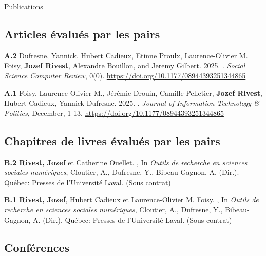 \documentclass{resume} %
\begin{document}
\begin{rSection}{Publications}

\subsection*{Articles évalués par les pairs}

{\textbf{A.2} Dufresne, Yannick, Hubert Cadieux, Etinne Proulx, Laurence-Olivier M. Foisy, \textbf{Jozef Rivest}, Alexandre Bouillon, and Jeremy Gilbert. 2025. . \textit{Social Science Computer Review}, 0(0). \href{https://doi.org/10.1177/08944393251344865}{https://doi.org/10.1177/08944393251344865}}

{\textbf{A.1} Foisy, Laurence-Olivier M., Jérémie Drouin, Camille Pelletier, \textbf{Jozef Rivest}, Hubert Cadieux, Yannick Dufresne. 2025. . \textit{Journal of Information Technology \& Politics}, December, 1-13. \href{https://doi.org/10.1177/08944393251344865}{https://doi.org/10.1177/08944393251344865}}

\subsection*{Chapitres de livres évalués par les pairs}

{\textbf{B.2 Rivest, Jozef} et Catherine Ouellet. , In \textit{Outils de recherche en sciences sociales numériques}, Cloutier, A., Dufresne, Y., Bibeau-Gagnon, A. (Dir.). Québec: Presses de l'Université Laval. (Sous contrat)} \par

{\textbf{B.1 Rivest, Jozef}, Hubert Cadieux et Laurence-Olivier M. Foisy. , In \textit{Outils de recherche en sciences sociales numériques}, Cloutier, A., Dufresne, Y., Bibeau-Gagnon, A. (Dir.). Québec: Presses de l'Université Laval.} (Sous contrat) \par

\subsection*{Conférences}


\end{rSection}
\end{document}
